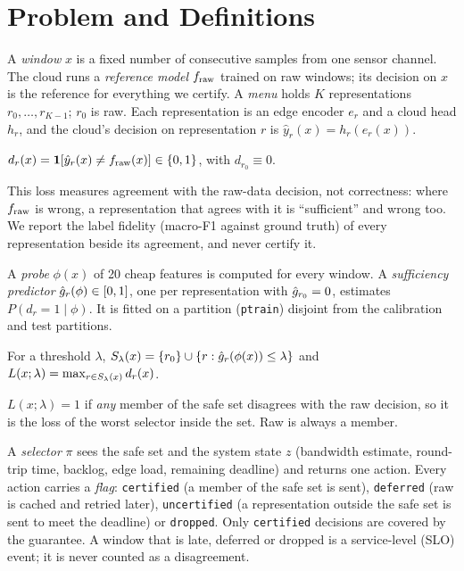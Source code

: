 \section{Problem and Definitions}
\label{sec:problem}

A \emph{window} $x$ is a fixed number of consecutive samples from one sensor channel. The cloud
runs a \emph{reference model} $f_{\mathrm{raw}}$ trained on raw windows; its decision on $x$ is the reference
for everything we certify. A \emph{menu} holds $K$ representations $r_0,\dots,r_{K-1}$; $r_0$ is
raw. Each representation is an edge encoder $e_r$ and a cloud head $h_r$, and the cloud's decision
on representation $r$ is $\hat y_r(x) = h_r(e_r(x))$.

\begin{definition}
$d_r(x) = \mathbf{1}[\hat y_r(x) \neq f_{\mathrm{raw}}(x)] \in \{0,1\}$, with $d_{r_0} \equiv 0$.
\end{definition}

This loss measures agreement with the raw-data decision, not correctness: where $f_{\mathrm{raw}}$ is wrong,
a representation that agrees with it is ``sufficient'' and wrong too. We report the label fidelity
(macro-F1 against ground truth) of every representation beside its agreement, and never certify it.

A \emph{probe} $\phi(x)$ of 20 cheap features is computed for every window. A \emph{sufficiency
predictor} $\hat g_r(\phi) \in [0,1]$, one per representation with $\hat g_{r_0} = 0$, estimates
$P(d_r = 1 \mid \phi)$. It is fitted on a partition (\texttt{ptrain}) disjoint from the
calibration and test partitions.

\begin{definition}
For a threshold $\lambda$,
$S_{\lambda}(x) = \{r_0\} \cup \{r : \hat g_r(\phi(x)) \le \lambda\}$ and
$L(x;\lambda) = \max_{r \in S_{\lambda}(x)} d_r(x)$.
\end{definition}

$L(x;\lambda) = 1$ if \emph{any} member of the safe set disagrees with the raw decision, so it is
the loss of the worst selector inside the set. Raw is always a member.

A \emph{selector} $\pi$ sees the safe set and the system state $z$ (bandwidth estimate, round-trip
time, backlog, edge load, remaining deadline) and returns one action. Every action carries a
\emph{flag}: \texttt{certified} (a member of the safe set is sent), \texttt{deferred} (raw is
cached and retried later), \texttt{uncertified} (a representation outside the safe set is sent
to meet the deadline) or \texttt{dropped}. Only \texttt{certified} decisions are covered by the
guarantee. A window that is late, deferred or dropped is a service-level (SLO) event; it is never
counted as a disagreement.

